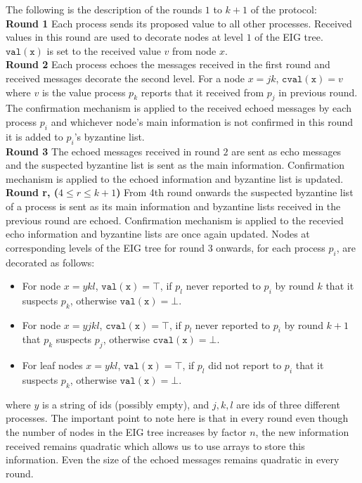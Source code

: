     The following is the description of the rounds $1$ to $k+1$ of the protocol: \\
    \textbf{Round 1} Each process sends its proposed value to all other processes. Received values in this round are used to decorate nodes at level $1$ of the EIG tree. $\mathtt{val(x)}$ is set to the received value $v$ from node $x$. \\
    \textbf{Round 2} Each process echoes the messages received in the first round and received messages decorate the second level. For a node $x = jk$, $\mathtt{cval(x)} = v$ where $v$ is the value process $p_k$ reports that it received from $p_j$ in previous round. The confirmation mechanism is applied to the received echoed messages by each process $p_i$ and whichever node's main information is not confirmed in this round it is added to $p_i$'s byzantine list. \\
    \textbf{Round 3} The echoed messages received in round $2$ are sent as echo messages and the suspected byzantine list is sent as the main information. Confirmation mechanism is applied to the echoed information and byzantine list is updated. \\
    \textbf{Round r, ($4 \leq r \leq k+1$)} From 4th round onwards the suspected byzantine list of a process is sent as its main information and byzantine lists received in the previous round are echoed. Confirmation mechanism is applied to the recevied echo information and byzantine lists are once again updated. Nodes at corresponding levels of the EIG tree for round 3 onwards, for each process $p_i$, are decorated as follows:
    \begin{itemize}
        \item For node $x=ykl$, $\mathtt{val(x)} = \top$, if $p_l$ never reported to $p_i$ by round $k$ that it suspects $p_k$, otherwise $\mathtt{val(x)} = \bot$.
        \item For node $x=yjkl$, $\mathtt{cval(x)} = \top$, if $p_l$ never reported to $p_i$ by round $k+1$ that $p_k$ suspects $p_j$, otherwise $\mathtt{cval(x)} = \bot$.
        \item For leaf nodes $x = ykl$, $\mathtt{val(x)} = \top$, if $p_l$ did not report to $p_i$ that it suspects $p_k$, otherwise $\mathtt{val(x)} = \bot$.
    \end{itemize}
where $y$ is a string of ids (possibly empty), and $j, k, l$ are ids of three different processes. The important point to note here is that in every round even though the number of nodes in the EIG tree increases by factor $n$, the new information received remains quadratic which allows us to use arrays to store this information. Even the size of the echoed messages remains quadratic in every round. 

